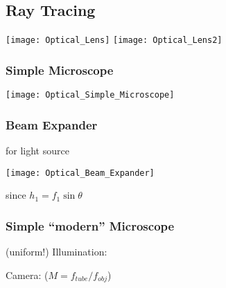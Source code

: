 \subsection{Ray Tracing}
%
\begin{minipage}{\linewidth}
    \texttt{[image: Optical\_Lens]}
    \qquad
    \texttt{[image: Optical\_Lens2]}
\end{minipage}
\begin{minipage}{\linewidth}
    \begin{minipage}[t]{.5\columnwidth-.5\columnsep}
        \subsubsection{Simple Microscope}
        \texttt{[image: Optical\_Simple\_Microscope]}
    \end{minipage}%
    \hspace{\columnsep}%
    \begin{minipage}[t]{.5\columnwidth-.5\columnsep}
        \subsubsection{Beam Expander}
        \hfill for light source

        \texttt{[image: Optical\_Beam\_Expander]}
    \end{minipage}

    \quad * since $h_1 = f_1\sin\theta$
\end{minipage}
\subsubsection{Simple ``modern'' Microscope}
%
\parbox{.5\columnwidth}{(uniform!) Illumination:}
\parbox{.5\columnwidth}{Camera: ($M = f_{tube} / f_{obj}$)}

